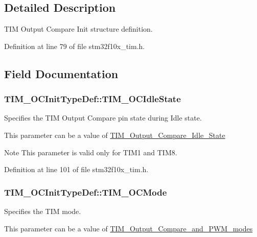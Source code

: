 \subsection{Detailed Description}
T\-I\-M Output Compare Init structure definition. 

Definition at line 79 of file stm32f10x\-\_\-tim.\-h.



\subsection{Field Documentation}
\hypertarget{struct_t_i_m___o_c_init_type_def_a2a28f2d62339e06caef12816e04a8f55}{
\subsubsection[{T\-I\-M\-\_\-\-O\-C\-Idle\-State}]{ T\-I\-M\-\_\-\-O\-C\-Init\-Type\-Def\-::\-T\-I\-M\-\_\-\-O\-C\-Idle\-State}}\label{struct_t_i_m___o_c_init_type_def_a2a28f2d62339e06caef12816e04a8f55}
\begin{DoxyVerb}   Specifies the TIM Output Compare pin state during Idle state.
\end{DoxyVerb}
 This parameter can be a value of \hyperlink{group___t_i_m___output___compare___idle___state}{T\-I\-M\-\_\-\-Output\-\_\-\-Compare\-\_\-\-Idle\-\_\-\-State} \begin{DoxyNote}{Note}
This parameter is valid only for T\-I\-M1 and T\-I\-M8. 
\end{DoxyNote}


Definition at line 101 of file stm32f10x\-\_\-tim.\-h.

\hypertarget{struct_t_i_m___o_c_init_type_def_ad4338ed2415b0d6d19589bf72b7ba3b0}{
\subsubsection[{T\-I\-M\-\_\-\-O\-C\-Mode}]{ T\-I\-M\-\_\-\-O\-C\-Init\-Type\-Def\-::\-T\-I\-M\-\_\-\-O\-C\-Mode}}\label{struct_t_i_m___o_c_init_type_def_ad4338ed2415b0d6d19589bf72b7ba3b0}
\begin{DoxyVerb}        Specifies the TIM mode.
\end{DoxyVerb}
 This parameter can be a value of \hyperlink{group___t_i_m___output___compare__and___p_w_m__modes}{T\-I\-M\-\_\-\-Output\-\_\-\-Compare\-\_\-and\-\_\-\-P\-W\-M\-\_\-modes} 

